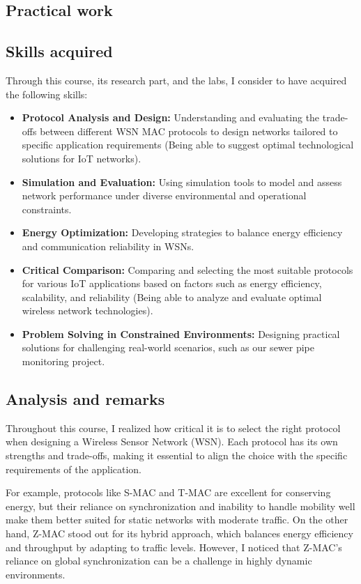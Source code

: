 \subsection{Practical work}
\subsection{Skills acquired}
Through this course, its research part, and the labs, I consider to have acquired the following skills:
\begin{itemize}
    \item \textbf{Protocol Analysis and Design:} Understanding and evaluating the trade-offs between different WSN MAC protocols to design networks tailored to specific application requirements (Being able to suggest optimal technological solutions for  IoT networks).
    \item \textbf{Simulation and Evaluation:} Using simulation tools to model and assess network performance under diverse environmental and operational constraints.
    \item \textbf{Energy Optimization:} Developing strategies to balance energy efficiency and communication reliability in WSNs.
    \item \textbf{Critical Comparison:} Comparing and selecting the most suitable protocols for various IoT applications based on factors such as energy efficiency, scalability, and reliability (Being able to analyze and evaluate optimal wireless network technologies).
    \item \textbf{Problem Solving in Constrained Environments:} Designing practical solutions for challenging real-world scenarios, such as our sewer pipe monitoring project.
\end{itemize}

\subsection{Analysis and remarks}

\indent \indent Throughout this course, I realized how critical it is to select the right protocol when designing a Wireless Sensor Network (WSN). Each protocol has its own strengths and trade-offs, making it essential to align the choice with the specific requirements of the application.

For example, protocols like S-MAC and T-MAC are excellent for conserving energy, but their reliance on synchronization and inability to handle mobility well make them better suited for static networks with moderate traffic. On the other hand, Z-MAC stood out for its hybrid approach, which balances energy efficiency and throughput by adapting to traffic levels. However, I noticed that Z-MAC’s reliance on global synchronization can be a challenge in highly dynamic environments.

